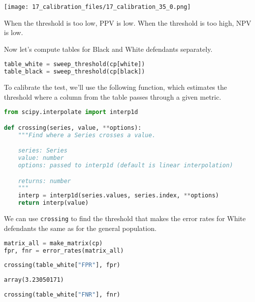 \begin{center}
\texttt{[image: 17\_calibration\_files/17\_calibration\_35\_0.png]}
\end{center}

When the threshold is too low, PPV is low. When the threshold is too
high, NPV is low.

Now let's compute tables for Black and White defendants separately.

\begin{lstlisting}[language=Python,style=source]
table_white = sweep_threshold(cp[white])
table_black = sweep_threshold(cp[black])
\end{lstlisting}

To calibrate the test, we'll use the following function, which estimates
the threshold where a column from the table passes through a given
metric.

\begin{lstlisting}[language=Python,style=source]
from scipy.interpolate import interp1d

def crossing(series, value, **options):
    """Find where a Series crosses a value.

    series: Series
    value: number
    options: passed to interp1d (default is linear interpolation)

    returns: number
    """
    interp = interp1d(series.values, series.index, **options)
    return interp(value)
\end{lstlisting}

We can use \passthrough{\lstinline!crossing!} to find the threshold that
makes the error rates for White defendants the same as for the general
population.

\begin{lstlisting}[language=Python,style=source]
matrix_all = make_matrix(cp)
fpr, fnr = error_rates(matrix_all)
\end{lstlisting}

\begin{lstlisting}[language=Python,style=source]
crossing(table_white["FPR"], fpr)
\end{lstlisting}

\begin{lstlisting}[style=output]
array(3.23050171)
\end{lstlisting}

\begin{lstlisting}[language=Python,style=source]
crossing(table_white["FNR"], fnr)
\end{lstlisting}


